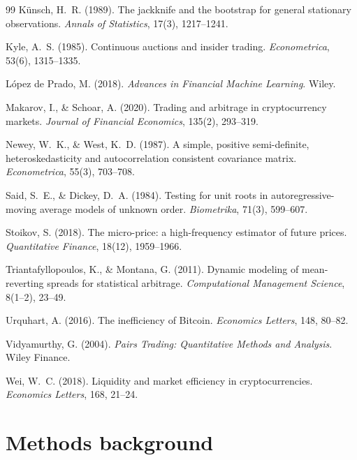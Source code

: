 \documentclass[11pt]{article}
\begin{document}
\begin{thebibliography}{99}
K\"unsch, H.~R. (1989). The jackknife and the bootstrap for general stationary
observations. \emph{Annals of Statistics}, 17(3), 1217--1241.

Kyle, A.~S. (1985). Continuous auctions and insider trading.
\emph{Econometrica}, 53(6), 1315--1335.

L\'opez de Prado, M. (2018). \emph{Advances in Financial Machine Learning}. Wiley.

Makarov, I., \& Schoar, A. (2020). Trading and arbitrage in cryptocurrency markets.
\emph{Journal of Financial Economics}, 135(2), 293--319.

Newey, W.~K., \& West, K.~D. (1987). A simple, positive semi-definite,
heteroskedasticity and autocorrelation consistent covariance matrix.
\emph{Econometrica}, 55(3), 703--708.

Said, S.~E., \& Dickey, D.~A. (1984). Testing for unit roots in autoregressive-moving
average models of unknown order. \emph{Biometrika}, 71(3), 599--607.

Stoikov, S. (2018). The micro-price: a high-frequency estimator of future prices.
\emph{Quantitative Finance}, 18(12), 1959--1966.

Triantafyllopoulos, K., \& Montana, G. (2011). Dynamic modeling of mean-reverting
spreads for statistical arbitrage. \emph{Computational Management Science}, 8(1--2), 23--49.

Urquhart, A. (2016). The inefficiency of Bitcoin. \emph{Economics Letters}, 148, 80--82.

Vidyamurthy, G. (2004). \emph{Pairs Trading: Quantitative Methods and Analysis}.
Wiley Finance.

Wei, W.~C. (2018). Liquidity and market efficiency in cryptocurrencies.
\emph{Economics Letters}, 168, 21--24.

\end{thebibliography}

\appendix

\section{Methods background}
\label{sec:appendix}
\end{document}
